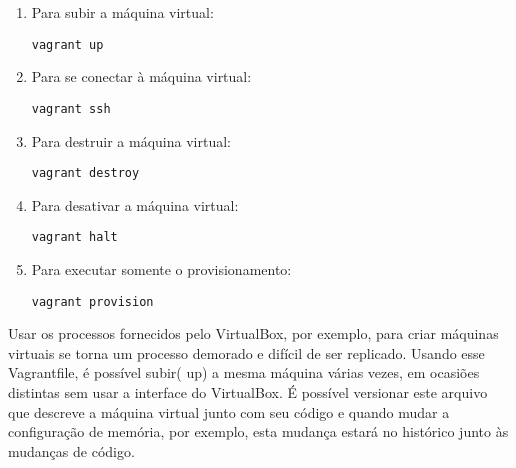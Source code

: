 \begin{enumerate}
   \item Para subir a máquina virtual:
    \begin{lstlisting}
vagrant up
    \end{lstlisting}
   \item Para se conectar à máquina virtual:
    \begin{lstlisting}
vagrant ssh
    \end{lstlisting}   
   \item Para destruir a máquina virtual:
    \begin{lstlisting}
vagrant destroy
    \end{lstlisting}
   \item Para desativar a máquina virtual:
    \begin{lstlisting}
vagrant halt
    \end{lstlisting}    
   \item Para executar somente o provisionamento:
    \begin{lstlisting}
vagrant provision
    \end{lstlisting}
\end{enumerate}
Usar os processos fornecidos pelo VirtualBox, 
por exemplo, para criar máquinas virtuais se torna um 
processo demorado e difícil de ser replicado. Usando 
esse Vagrantfile, é possível subir( up) a mesma máquina 
várias vezes, em ocasiões distintas sem usar a 
interface do VirtualBox. É possível versionar este 
arquivo que descreve a  máquina virtual junto com seu 
código e quando mudar a configuração de memória, por 
exemplo, esta mudança estará no histórico junto às 
mudanças de código.

